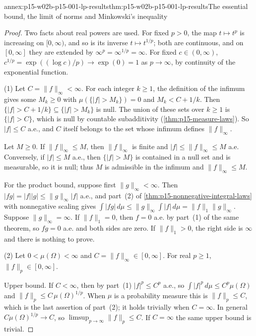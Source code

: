 \begin{annexitem}{annex:p15-w02b-p15-001-lp-results}{thm:p15-w02b-p15-001-lp-results}{The essential bound, the limit of norms and Minkowski's inequality}
\begin{proof}
Two facts about real powers are used. For fixed \(p>0\), the map
\(t\mapsto t^p\) is increasing on \([0,\infty)\), and so is its inverse
\(t\mapsto t^{1/p}\); both are continuous, and on \([0,\infty]\) they
are extended by \(\infty^p=\infty^{1/p}=\infty\). For fixed
\(c\in(0,\infty)\), \(c^{1/p}=\exp((\log c)/p)\to\exp(0)=1\) as
\(p\to\infty\), by continuity of the exponential function.

(1) Let \(C=\|f\|_\infty<\infty\). For each integer \(k\geq1\), the
definition of the infimum gives some \(M_k\geq0\) with
\(\mu(\{|f|>M_k\})=0\) and \(M_k<C+1/k\). Then
\(\{|f|>C+1/k\}\subseteq\{|f|>M_k\}\) is null. The union of these sets
over \(k\geq1\) is \(\{|f|>C\}\), which is null by countable
subadditivity (\cref{thm:p15-measure-laws}). So \(|f|\leq C\) a.e.,
and \(C\) itself belongs to the set whose infimum defines
\(\|f\|_\infty\).

Let \(M\geq0\). If \(\|f\|_\infty\leq M\), then \(\|f\|_\infty\) is
finite and \(|f|\leq\|f\|_\infty\leq M\) a.e. Conversely, if
\(|f|\leq M\) a.e., then \(\{|f|>M\}\) is contained in a null set and is
measurable, so it is null; thus \(M\) is admissible in the infimum and
\(\|f\|_\infty\leq M\).

For the product bound, suppose first \(\|g\|_\infty<\infty\). Then
\(|fg|=|f||g|\leq\|g\|_\infty|f|\) a.e., and part~(2) of
\cref{thm:p15-nonnegative-integral-laws} with nonnegative scaling gives
\(\int|fg|\,d\mu\leq\|g\|_\infty\int|f|\,d\mu=\|f\|_1\|g\|_\infty\).
Suppose \(\|g\|_\infty=\infty\). If \(\|f\|_1=0\), then \(f=0\) a.e. by
part~(1) of the same theorem, so \(fg=0\) a.e. and both sides are zero.
If \(\|f\|_1>0\), the right side is \(\infty\) and there is nothing to
prove.

(2) Let \(0<\mu(\Omega)<\infty\) and \(C=\|f\|_\infty\in[0,\infty]\).
For real \(p\geq1\), \(\|f\|_p\in[0,\infty]\).

Upper bound. If \(C<\infty\), then by part~(1) \(|f|^p\leq C^p\) a.e.,
so \(\int|f|^p\,d\mu\leq C^p\mu(\Omega)\) and
\(\|f\|_p\leq C\,\mu(\Omega)^{1/p}\). When \(\mu\) is a probability
measure this is \(\|f\|_p\leq C\), which is the last assertion of
part~(2); it holds trivially when \(C=\infty\). In general
\(C\mu(\Omega)^{1/p}\to C\), so \(\limsup_{p\to\infty}\|f\|_p\leq C\).
If \(C=\infty\) the same upper bound is trivial.


\end{proof}
\end{annexitem}
